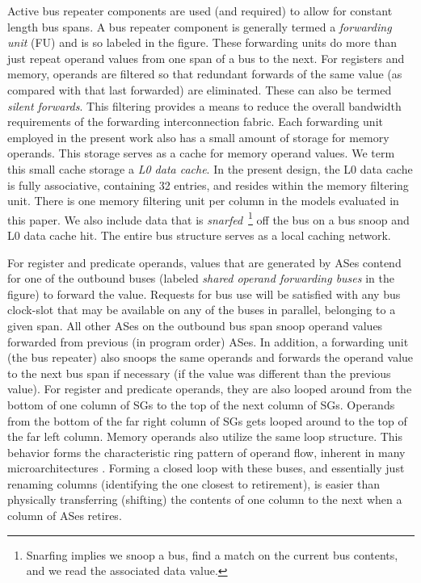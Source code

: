 \documentclass{book}
\begin{document}
Active bus repeater components are used (and required) to 
allow for constant length bus spans.
A bus repeater component is generally termed a
{\em forwarding unit} (FU) and is so labeled in the figure.
These forwarding units do more than just repeat operand values from
one span of a bus to the next.
For registers and memory, operands are filtered so that
redundant forwards of the same value (as compared with that last forwarded)
are eliminated.  These can also be termed {\em silent forwards}.
This filtering provides a means to reduce the overall bandwidth
requirements of the forwarding interconnection fabric.
Each forwarding unit employed in the present work also has a small
amount of storage for memory operands.
This storage serves as a cache for memory operand values.
We term this small cache storage a {\em L0 data cache}.
In the present design, the L0 data cache is fully associative,
containing 32 entries, and resides within the memory filtering
unit.  There is one memory filtering unit per column in the
models evaluated in this paper.  We also include data that is
{\em snarfed}~\footnote{Snarfing implies we snoop a bus, find a
match on the current bus contents, and we read the associated
data value.}
off the bus on a bus snoop and L0 data cache hit.
The entire bus structure serves as a local caching network.

For register and predicate operands, values that are generated
by ASes contend for one of the outbound buses
(labeled {\em shared operand forwarding buses} in the figure) 
to forward the value.
Requests for bus use will be satisfied with any bus clock-slot that may be
available on any of the buses in parallel, belonging to
a given span.  All other ASes on the outbound bus span snoop
operand values forwarded from previous (in program order)
ASes.  In addition, a forwarding unit (the bus repeater) also
snoops the same operands and forwards the operand value to the
next bus span if necessary (if the value was different than the previous
value).  For register and predicate operands, they are also
looped around from the bottom of one column of SGs
to the top of the next column of SGs.  
Operands from the bottom of the
far right column of SGs gets looped around to the
top of the far left column. Memory operands also utilize the
same loop structure. 
This behavior forms the characteristic ring pattern of operand flow,
inherent in many microarchitectures \cite{Ranganathan98}.
Forming a closed loop
with these buses, and essentially just renaming columns (identifying the
one closest to retirement), is easier than physically transferring
(shifting) the contents of one column to the next when a column
of ASes retires.
\end{document}
